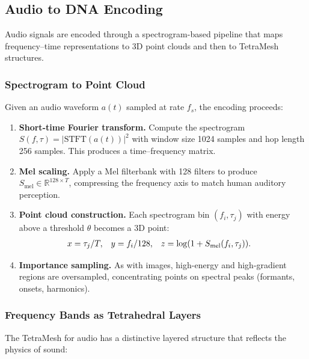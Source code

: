 \subsection{Audio to DNA Encoding}
\label{sec:audio-to-dna}

Audio signals are encoded through a spectrogram-based pipeline that maps frequency--time representations to 3D point clouds and then to TetraMesh structures.

\subsubsection{Spectrogram to Point Cloud}

Given an audio waveform $a(t)$ sampled at rate $f_s$, the encoding proceeds:

\begin{enumerate}[leftmargin=1.8em]
  \item \textbf{Short-time Fourier transform.} Compute the spectrogram $S(f, \tau) = |\text{STFT}(a(t))|^2$ with window size 1024 samples and hop length 256 samples. This produces a time--frequency matrix.
  \item \textbf{Mel scaling.} Apply a Mel filterbank with 128 filters to produce $S_{\text{mel}} \in \mathbb{R}^{128 \times T}$, compressing the frequency axis to match human auditory perception.
  \item \textbf{Point cloud construction.} Each spectrogram bin $(f_i, \tau_j)$ with energy above a threshold $\theta$ becomes a 3D point:
  \begin{align}
    x &= \tau_j / T, & y &= f_i / 128, & z &= \log(1 + S_{\text{mel}}(f_i, \tau_j)). \notag
  \end{align}
  \item \textbf{Importance sampling.} As with images, high-energy and high-gradient regions are oversampled, concentrating points on spectral peaks (formants, onsets, harmonics).
\end{enumerate}

\subsubsection{Frequency Bands as Tetrahedral Layers}

The TetraMesh for audio has a distinctive layered structure that reflects the physics of sound:

